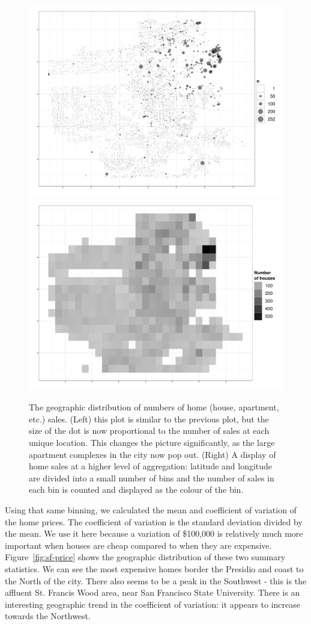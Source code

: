 \documentclass[oneside]{article}
\begin{document}
\begin{figure}[htbp]
  \centering
    \includegraphics[width=0.5\linewidth]{sf-geo-n}%
    \includegraphics[width=0.5\linewidth]{sf-bin-n}
  \caption{The geographic distribution of numbers of home (house, apartment, etc.) sales.  (Left) this plot is similar to the previous plot, but the size of the dot is now proportional to the number of sales at each unique location.  This changes the picture significantly, as the large apartment complexes in the city now pop out.  (Right) A display of home sales at a higher level of aggregation: latitude and longitude are divided into a small number of bins and the number of sales in each bin is counted and displayed as the colour of the bin.}
  \label{fig:sf-n}
\end{figure}

Using that same binning, we calculated the mean and coefficient of variation of the home prices.  The coefficient of variation is the standard deviation divided by the mean.  We use it here because a variation of \$100,000 is relatively much more important when houses are cheap compared to when they are expensive.  Figure~\ref{fig:sf-price} shows the geographic distribution of these two summary statistics.   We can see the most expensive homes border the Presidio and coast to the North of the city.  There also seems to be a peak in the Southwest - this is the affluent St. Francis Wood area, near San Francisco State University.  There is an interesting geographic trend in the coefficient of variation: it appears to increase towards the Northwest.  
\end{document}
